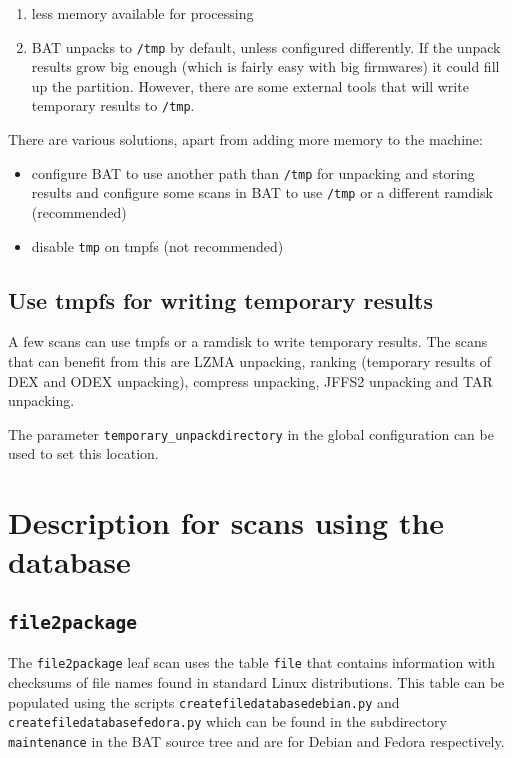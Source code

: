 \documentclass[10pt,a4paper]{article}
\begin{document}
\begin{enumerate}
\item less memory available for processing
\item BAT unpacks to \texttt{/tmp} by default, unless configured differently. If
the unpack results grow big enough (which is fairly easy with big firmwares) it
could fill up the partition. However, there are some external tools that will
write temporary results to \texttt{/tmp}.
\end{enumerate}

There are various solutions, apart from adding more memory to the machine:

\begin{itemize}
\item configure BAT to use another path than \texttt{/tmp} for unpacking and
storing results and configure some scans in BAT to use \texttt{/tmp} or a
different ramdisk (recommended)
\item disable \texttt{tmp} on tmpfs (not recommended)
\end{itemize}

\subsection{Use tmpfs for writing temporary results}

A few scans can use tmpfs or a ramdisk to write temporary results. The scans
that can benefit from this are LZMA unpacking, ranking (temporary results of
DEX and ODEX unpacking), compress unpacking, JFFS2 unpacking and TAR unpacking.

The parameter \texttt{temporary\_unpackdirectory} in the global configuration
can be used to set this location.

\section{Description for scans using the database}

\subsection{\texttt{file2package}}

The \texttt{file2package} leaf scan uses the table \texttt{file} that contains
information with checksums of file names found in standard Linux distributions.
This table can be populated using the scripts
\texttt{createfiledatabasedebian.py} and \texttt{createfiledatabasefedora.py}
which can be found in the subdirectory \texttt{maintenance} in the BAT source
tree and are for Debian and Fedora respectively.
\end{document}
